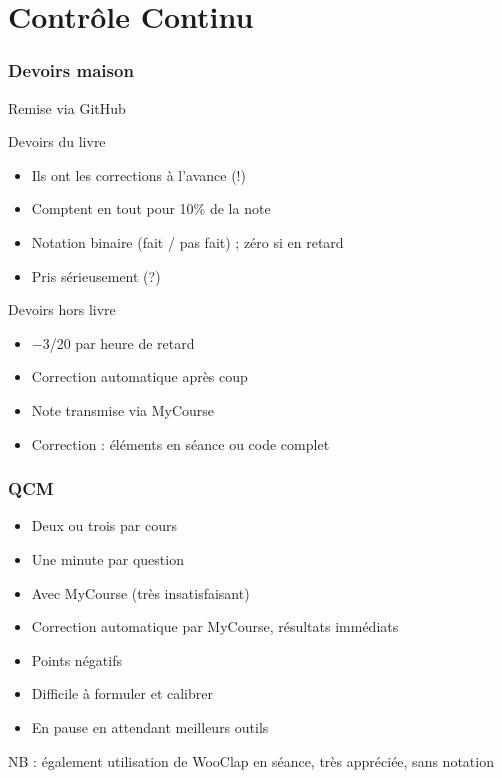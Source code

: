 \documentclass[french]{beamer}
\begin{document}
\section{Contrôle Continu}
\begin{frame}
	\frametitle{Devoirs maison}
	Remise via GitHub
	\begin{block}{Devoirs du livre}
		\begin{itemize}
			\item Ils ont les corrections à l’avance (!)
			\item Comptent en tout pour 10\% de la note
			\item Notation binaire (fait / pas fait) ; zéro si en retard
			\item Pris sérieusement (?)
		\end{itemize}
	\end{block}
	\begin{block}{Devoirs hors livre}
		\begin{itemize}
			\item −3/20 par heure de retard
			\item Correction automatique après coup
			\item Note transmise via MyCourse
			\item Correction : éléments en séance ou code complet
		\end{itemize}
	\end{block}
\end{frame}

\begin{frame}
	\frametitle{QCM}
	\begin{itemize}
		\item Deux ou trois par cours
		\item Une minute par question
		\item Avec MyCourse (très insatisfaisant)
		\item Correction automatique par MyCourse, résultats immédiats
		\item Points négatifs
		\item Difficile à formuler et calibrer
		\item En pause en attendant meilleurs outils
	\end{itemize}
	NB : également utilisation de WooClap en séance, très appréciée, sans notation
\end{frame}
\end{document}
